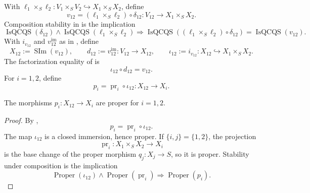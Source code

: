 \begin{definition}
  With
  $\ell_1\times_S\ell_2\colon V_1\times_SV_2\hookrightarrow X_1\times_SX_2$,
  define
  \[
    v_{12}
      =(\ell_1\times_S\ell_2)\circ\delta_{12}
      \colon V_{12}\to X_1\times_SX_2.
  \]
  Composition stability in
   is the implication
  \[
    \operatorname{IsQCQS}(\delta_{12})\wedge
      \operatorname{IsQCQS}(\ell_1\times_S\ell_2)
      \Longrightarrow
      \operatorname{IsQCQS}
        ((\ell_1\times_S\ell_2)\circ\delta_{12})
      =\operatorname{IsQCQS}(v_{12}).
  \]
  With $i_{v_{12}}$ and $v_{12}^{\mathrm{im}}$ as in
  ,
  define
  \[
    X_{12}:=\operatorname{SIm}(v_{12}),\qquad
    d_{12}:=v_{12}^{\mathrm{im}}\colon V_{12}\to X_{12},\qquad
    \iota_{12}:=i_{v_{12}}\colon X_{12}\hookrightarrow X_1\times_SX_2.
  \]
  The factorization equality of
   is
  \[
    \iota_{12}\circ d_{12}=v_{12}.
  \]
  For $i=1,2$, define
  \[
    p_i=\operatorname{pr}_i\circ\iota_{12}\colon X_{12}\to X_i.
  \]
\end{definition}

\begin{lemma}
  \label{lemma:nagata-comparison-projections-proper}

  The morphisms $p_i\colon X_{12}\to X_i$ are proper for $i=1,2$.
\end{lemma}

\begin{proof}
  By ,
  \[
    p_i=\operatorname{pr}_i\circ\iota_{12}.
  \]
  The map $\iota_{12}$ is a closed immersion, hence proper.  If
  $\{i,j\}=\{1,2\}$, the projection
  \[
    \operatorname{pr}_i\colon X_1\times_SX_2\to X_i
  \]
  is the base change of the proper morphism $q_j\colon X_j\to S$, so it is
  proper.  Stability under composition is the implication
  \[
    \operatorname{Proper}(\iota_{12})
      \wedge\operatorname{Proper}(\operatorname{pr}_i)
      \Longrightarrow\operatorname{Proper}(p_i).
  \]
\end{proof}

